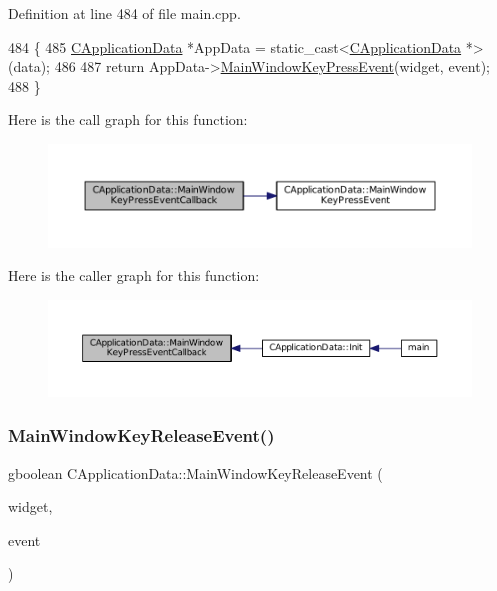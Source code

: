 Definition at line 484 of file main.\+cpp.


\begin{DoxyCode}
484                                                                                                            
         \{
485     \hyperlink{classCApplicationData}{CApplicationData} *AppData = \textcolor{keyword}{static\_cast<}\hyperlink{classCApplicationData}{CApplicationData} *\textcolor{keyword}{>}(data);
486 
487     \textcolor{keywordflow}{return} AppData->\hyperlink{classCApplicationData_a9b451765c93ecf00322f5450d29bfffe}{MainWindowKeyPressEvent}(widget, event);
488 \}
\end{DoxyCode}
Here is the call graph for this function\+:
\nopagebreak
\begin{figure}[H]
\begin{center}
\leavevmode
\includegraphics[width=350pt]{classCApplicationData_aca6cce5b1cd5142984d2880294ff6ed4_cgraph}
\end{center}
\end{figure}
Here is the caller graph for this function\+:
\nopagebreak
\begin{figure}[H]
\begin{center}
\leavevmode
\includegraphics[width=350pt]{classCApplicationData_aca6cce5b1cd5142984d2880294ff6ed4_icgraph}
\end{center}
\end{figure}
\hypertarget{classCApplicationData_aff9f46bccd458a0dcca968e4a46c7d9b}{}\label{classCApplicationData_aff9f46bccd458a0dcca968e4a46c7d9b} 
\subsubsection{\texorpdfstring{Main\+Window\+Key\+Release\+Event()}{MainWindowKeyReleaseEvent()}}
{\footnotesize\ttfamily gboolean C\+Application\+Data\+::\+Main\+Window\+Key\+Release\+Event (\begin{DoxyParamCaption}\item[{Gtk\+Widget $\ast$}]{widget,  }\item[{Gdk\+Event\+Key $\ast$}]{event }\end{DoxyParamCaption})\hspace{0.3cm}{\ttfamily [protected]}}



